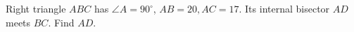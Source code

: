 Right triangle $ ABC $ has $\angle A=90^\circ $, $ AB=20,AC=17 $. Its internal bisector $ AD $ meets $ BC $. Find $ AD $.

